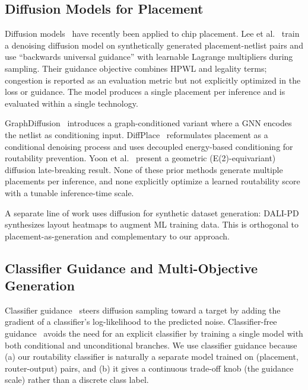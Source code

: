 \documentclass{ieeeaccess}
\begin{document}
\subsection{Diffusion Models for Placement}

Diffusion models~\cite{sohl2015deep, ho2020ddpm} have recently been applied to chip placement. Lee et al.~\cite{lee2024chipdiffusion} train a denoising diffusion model on synthetically generated placement-netlist pairs and use ``backwards universal guidance'' with learnable Lagrange multipliers during sampling. Their guidance objective combines HPWL and legality terms; congestion is reported as an evaluation metric but not explicitly optimized in the loss or guidance. The model produces a single placement per inference and is evaluated within a single technology.

GraphDiffusion~\cite{fang2025graphdiffusion} introduces a graph-conditioned variant where a GNN encodes the netlist as conditioning input. DiffPlace~\cite{trung2025diffplace} reformulates placement as a conditional denoising process and uses decoupled energy-based conditioning for routability prevention. Yoon et al.~\cite{yoon2025geometric} present a geometric (E(2)-equivariant) diffusion late-breaking result. None of these prior methods generate multiple placements per inference, and none explicitly optimize a learned routability score with a tunable inference-time scale.

A separate line of work uses diffusion for synthetic dataset generation: DALI-PD~\cite{wu2025dalipd} synthesizes layout heatmaps to augment ML training data. This is orthogonal to placement-as-generation and complementary to our approach.

\subsection{Classifier Guidance and Multi-Objective Generation}

Classifier guidance~\cite{dhariwal2021guidance} steers diffusion sampling toward a target by adding the gradient of a classifier's log-likelihood to the predicted noise. Classifier-free guidance~\cite{ho2021classifier} avoids the need for an explicit classifier by training a single model with both conditional and unconditional branches. We use classifier guidance because (a) our routability classifier is naturally a separate model trained on (placement, router-output) pairs, and (b) it gives a continuous trade-off knob (the guidance scale) rather than a discrete class label.
\end{document}
